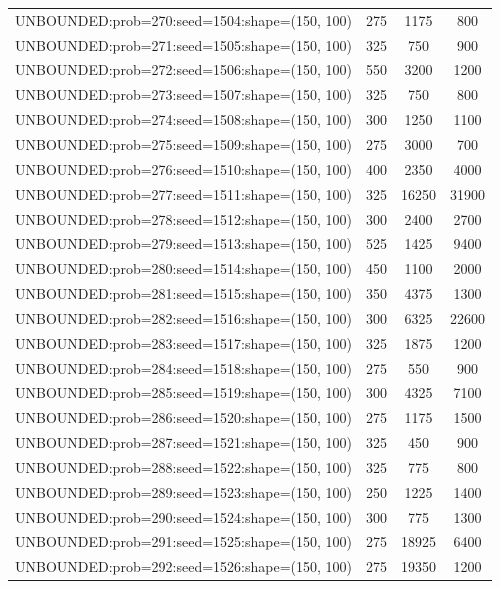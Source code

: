 \begin{longtable}{lccc}
UNBOUNDED:prob=270:seed=1504:shape=(150, 100) &      275 &  1175 &    800 \\
UNBOUNDED:prob=271:seed=1505:shape=(150, 100) &      325 &   750 &    900 \\
UNBOUNDED:prob=272:seed=1506:shape=(150, 100) &      550 &  3200 &   1200 \\
UNBOUNDED:prob=273:seed=1507:shape=(150, 100) &      325 &   750 &    800 \\
UNBOUNDED:prob=274:seed=1508:shape=(150, 100) &      300 &  1250 &   1100 \\
UNBOUNDED:prob=275:seed=1509:shape=(150, 100) &      275 &  3000 &    700 \\
UNBOUNDED:prob=276:seed=1510:shape=(150, 100) &      400 &  2350 &   4000 \\
UNBOUNDED:prob=277:seed=1511:shape=(150, 100) &      325 & 16250 &  31900 \\
UNBOUNDED:prob=278:seed=1512:shape=(150, 100) &      300 &  2400 &   2700 \\
UNBOUNDED:prob=279:seed=1513:shape=(150, 100) &      525 &  1425 &   9400 \\
UNBOUNDED:prob=280:seed=1514:shape=(150, 100) &      450 &  1100 &   2000 \\
UNBOUNDED:prob=281:seed=1515:shape=(150, 100) &      350 &  4375 &   1300 \\
UNBOUNDED:prob=282:seed=1516:shape=(150, 100) &      300 &  6325 &  22600 \\
UNBOUNDED:prob=283:seed=1517:shape=(150, 100) &      325 &  1875 &   1200 \\
UNBOUNDED:prob=284:seed=1518:shape=(150, 100) &      275 &   550 &    900 \\
UNBOUNDED:prob=285:seed=1519:shape=(150, 100) &      300 &  4325 &   7100 \\
UNBOUNDED:prob=286:seed=1520:shape=(150, 100) &      275 &  1175 &   1500 \\
UNBOUNDED:prob=287:seed=1521:shape=(150, 100) &      325 &   450 &    900 \\
UNBOUNDED:prob=288:seed=1522:shape=(150, 100) &      325 &   775 &    800 \\
UNBOUNDED:prob=289:seed=1523:shape=(150, 100) &      250 &  1225 &   1400 \\
UNBOUNDED:prob=290:seed=1524:shape=(150, 100) &      300 &   775 &   1300 \\
UNBOUNDED:prob=291:seed=1525:shape=(150, 100) &      275 & 18925 &   6400 \\
UNBOUNDED:prob=292:seed=1526:shape=(150, 100) &      275 & 19350 &   1200 \\

\end{longtable}
